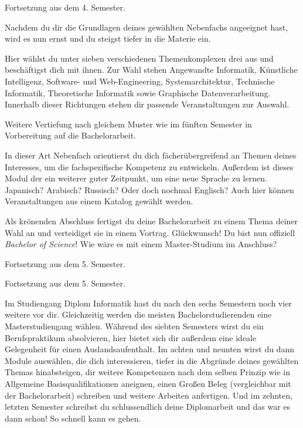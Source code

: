 Fortsetzung aus dem 4. Semester.

Nachdem du dir die Grundlagen deines gewählten Nebenfachs angeeignet hast, wird es nun ernst und du steigst tiefer in die Materie ein.

Hier wählst du unter sieben verschiedenen Themenkomplexen drei aus und beschäftigst dich mit ihnen.
Zur Wahl stehen Angewandte Informatik, Künstliche Intelligenz, Software- und Web-Engineering, Systemarchitektur, Technische Informatik, Theoretische Informatik sowie Graphische Datenverarbeitung.
Innerhalb dieser Richtungen stehen dir passende Veranstaltungen zur Auswahl.


Weitere Vertiefung nach gleichem Muster wie im fünften Semester in Vorbereitung auf die Bachelorarbeit.

In dieser Art Nebenfach orientierst du dich fächerübergreifend an Themen deines Interesses, um die fachspezifische Kompetenz zu entwickeln.
Außerdem ist dieses Modul der ein weiterer guter Zeitpunkt, um eine neue Sprache zu lernen. Japanisch? Arabisch? Russisch? Oder doch nochmal Englisch?
Auch hier können Veranstaltungen aus einem Katalog gewählt werden.

\newpage

Als krönenden Abschluss fertigst du deine Bachelorarbeit zu einem Thema deiner Wahl an und verteidigst sie in einem Vortrag.
Glückwunsch! Du bist nun offiziell \textit{Bachelor of Science}! Wie wäre es mit einem Master-Studium im Anschluss?

Fortsetzung aus dem 5. Semester.

Fortsetzung aus dem 5. Semester.


Im Studiengang Diplom Informatik hast du nach den sechs Semestern noch vier weitere vor dir. Gleichzeitig werden die meisten Bachelorstudierenden eine Masterstudiengang wählen.
Während des siebten Semesters wirst du ein Berufspraktikum absolvieren, hier bietet sich dir außerdem eine ideale Gelegenheit für einen Auslandsaufenthalt.
Im achten und neunten wirst du dann Module auswählen, die dich interessieren, tiefer in die Abgründe deines gewählten Themas hinabsteigen, dir weitere Kompetenzen nach dem selben Prinzip wie in \glqq{}Allgemeine Basisqualifikationen\grqq{} aneignen, einen \glqq{}Großen Beleg\grqq{} (vergleichbar mit der Bachelorarbeit) schreiben und weitere Arbeiten anfertigen.
Und im zehnten, letzten Semester schreibst du schlussendlich deine Diplomarbeit und das war es dann schon!
So schnell kann es gehen.

